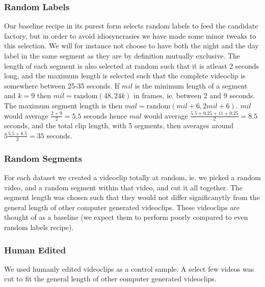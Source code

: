 \subsubsection{Random Labels}
% 
Our baseline recipe in its purest form selects random labels to feed the candidate factory, but in order to avoid idiosyncrasies we have made some minor tweaks to this selection. We will for instance not choose to have both the night and the day label in the same segment as they are by definition mutually exclusive. The length of each segment is also selected at random such that it is atleast 2 seconds long, and the maximum length is selected such that the complete videoclip is somewhere between 25-35 seconds. If $mil$ is the minimum length of a segment and $k=9$ then $mil=\text{random}(48,24k)$ in frames, ie. between 2 and 9 seconds. The maximum segment length is then $mal=\text{random}(mil+6, 2mil+6)$. $mil$ would average $\frac{2+9}{2}=5.5$ seconds hence $mal$ would average $\frac{5.5+0.25+11+0.25}{2}=8.5$ seconds, and the total clip length, with 5 segments, then averages around $5\frac{5.5+8.5}{2}=35$ seconds.
%
\subsubsection{Random Segments}
% 
For each dataset we created a videoclip totally at random, ie. we picked a random video, and a random segment within that video, and cut it all together. The segment length was chosen such that they would not differ significanytly from the general length of other computer generated videoclips. These videoclips are thought of as a baseline (we expect them to perform poorly compared to even random labels recipe).
%
\subsubsection{Human Edited}
% 
We used humanly edited videoclips as a control sample. A select few videos was cut to fit the general length of other computer generated videoclips.
%
